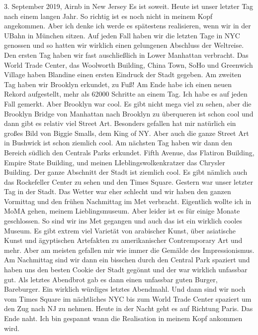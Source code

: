 \documentclass[11pt]{book}
\begin{document}
3. September 2019, Airnb in New Jersey
Es ist soweit. Heute ist unser letzter Tag nach einem langen Jahr. So richtig ist es noch nicht in meinem Kopf angekommen. Aber ich denke ich werde es 
spätestens realisieren, wenn wir in der UBahn in München sitzen. Auf jeden Fall haben wir die letzten Tage in NYC genossen und so hatten wir wirklich einen 
gelungenen Abschluss der Weltreise. Den ersten Tag haben wir fast auschließlich in Lower Manhattan verbracht. Das World Trade Center, das Woolworth Building, 
China Town, SoHo und Greenwich Village haben Blandine einen ersten Eindruck der Stadt gegeben. Am zweiten Tag haben wir Brooklyn erkundet, zu Fuß! Am Ende 
habe ich einen neuen Rekord aufgestellt, mehr als 62000 Schritte an einem Tag. Ich habe es auf jeden Fall gemerkt. Aber Brooklyn war cool. Es gibt nicht mega 
viel zu sehen, aber die Brooklyn Bridge von Manhattan nach Brooklyn zu überqueren ist schon cool und dann gibt es relativ viel Street Art. Besonders gefallen 
hat mir natürlich ein großes Bild von Biggie Smalls, dem King of NY. Aber auch die ganze Street Art in Bushwick ist schon ziemlich cool. Am nächsten Tag 
haben wir dann den Bereich südlich den Centrals Parks erkundet. Fifth Avenue, das Flatiron Building, Empire State Building, und meinen LIeblingswolkenkratzer 
das Chrysler Building. Der ganze Abschnitt der Stadt ist ziemlich cool. Es gibt nämlich auch das Rockefeller Center zu sehen und den Times Square. Gestern 
war unser letzter Tag in der Stadt. Das Wetter war eher schlecht und wir haben den ganzen Vormittag und den frühen Nachmittag im Met verbracht. Eigentlich wollte 
ich in MoMA gehen, meinem Lieblingsmuseum. Aber leider ist es für einige Monate geschlossen. So sind wir ins Met gegangen und auch das ist ein wirklich cooles Museum. 
Es gibt extrem viel Varietät von arabischer Kunst, über asiatische Kunst und ägyptischen Artefakten zu amerikanischer Contremporary Art und mehr. Aber am 
meisten gefallen mir wie immer die Gemälde des Impressionismus. Am Nachmittag sind wir dann ein bisschen durch den Central Park spaziert und haben uns den 
besten Cookie der Stadt gegönnt und der war wirklich unfassbar gut. Als letztes Abendbrot gab es dann einen unfassbar guten Burger, Bareburger.  Ein wirklich 
würdiges letztes Abendmahl. Und dann sind wir noch vom Times Square im nächtliches NYC bis zum World Trade Center spaziert um den Zug nach NJ zu nehmen. 
Heute in der Nacht geht es auf Richtung Paris. Das Ende naht. Ich bin gespannt wann die Realisation in meinem Kopf ankommen wird. 
\end{document}
